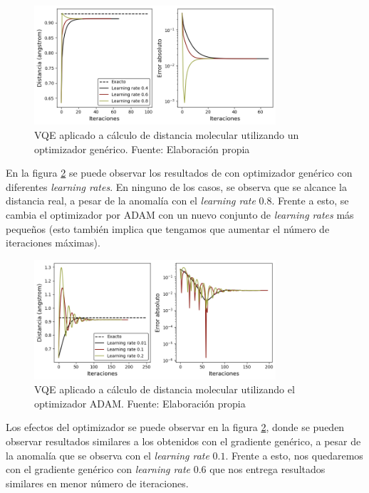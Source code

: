 \begin{figure}[H]
\centering
\includegraphics[width=0.8\textwidth]{figures/S4/moleculas/estructuras1.png}
\caption{\label{fig:41} VQE aplicado a cálculo de distancia molecular utilizando un optimizador genérico. Fuente: Elaboración propia}
\end{figure}

En la figura \ref{fig:42} se puede observar los resultados de con optimizador genérico con diferentes \textit{learning rates}. En ninguno de los casos, se observa que se alcance la distancia real, a pesar de la anomalía con el \textit{learning rate} $0.8$. Frente a esto, se cambia el optimizador por ADAM con un nuevo conjunto de \textit{learning rates} más pequeños (esto también implica que tengamos que aumentar el número de iteraciones máximas).

\begin{figure}[H]
\centering
\includegraphics[width=0.8\textwidth]{figures/S4/moleculas/estructuras2.png}
\caption{\label{fig:42} VQE aplicado a cálculo de distancia molecular utilizando el optimizador ADAM. Fuente: Elaboración propia}
\end{figure}


Los efectos del optimizador se puede observar en la figura \ref{fig:42}, donde se pueden observar resultados similares a los obtenidos con el gradiente genérico, a pesar de la anomalía que se observa con el \textit{learning rate} $0.1$. Frente a esto, nos quedaremos con el gradiente genérico con \textit{learning rate} $0.6$ que nos entrega resultados similares en menor número de iteraciones.


